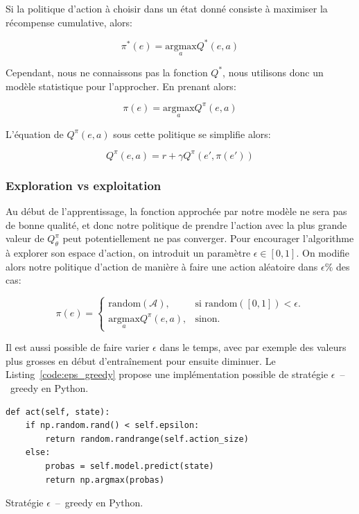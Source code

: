 \documentclass[11pt]{article}
\begin{document}
Si la politique d'action à choisir dans un état donné consiste à maximiser la
récompense cumulative, alors:

\begin{latex}
\[
\pi^*(e) = \underset{a}{\mathrm{argmax}} Q^*(e, a)
\]
\end{latex}

Cependant, nous ne connaissons pas la fonction \(Q^*\), nous utilisons donc un
modèle statistique pour l'approcher. En prenant alors:

\begin{latex}
\[
\pi(e) = \underset{a}{\mathrm{argmax}} Q^\pi(e, a)
\]
\end{latex}


L'équation de \(Q^\pi(e,a)\) sous cette politique se simplifie alors:

\begin{latex}
\[
Q^\pi(e,a) = r + \gamma Q^\pi(e', \pi(e'))
\]
\end{latex}


\subsubsection{Exploration vs exploitation}
\label{sec:org4ceccbb}

Au début de l'apprentissage, la fonction approchée par notre modèle ne sera pas de bonne qualité, et donc notre politique de prendre l'action avec la plus grande valeur de \(Q^\pi_\theta\) peut potentiellement ne pas converger. Pour encourager l'algorithme à explorer son espace d'action, on introduit un paramètre \(\epsilon \in [0,1]\). On modifie alors notre politique d'action de manière à faire une action aléatoire dans \(\epsilon\%\) des cas:

\begin{latex}
\[
\pi(e)=\begin{cases}
    \mathrm{random}(\mathcal{A}), & \text{si $\mathrm{random}([0,1])<\epsilon$}.\\
    \underset{a}{\mathrm{argmax}} Q^\pi(e, a), & \text{sinon}.
  \end{cases}
\]
\end{latex}


Il est aussi possible de faire varier \(\epsilon\) dans le temps, avec par exemple des valeurs plus grosses en début d'entraînement pour ensuite diminuer. Le Listing \ref{code:eps_greedy} propose une implémentation possible de stratégie \(\epsilon\) – greedy en Python.

\begin{listing}[htbp]
\begin{verbatim}
def act(self, state):
    if np.random.rand() < self.epsilon:
        return random.randrange(self.action_size)
    else:
        probas = self.model.predict(state)
        return np.argmax(probas)
\end{verbatim}
\caption{\label{code:eps_greedy}
Stratégie \(\epsilon\) – greedy en Python.}
\end{listing}
\end{document}
